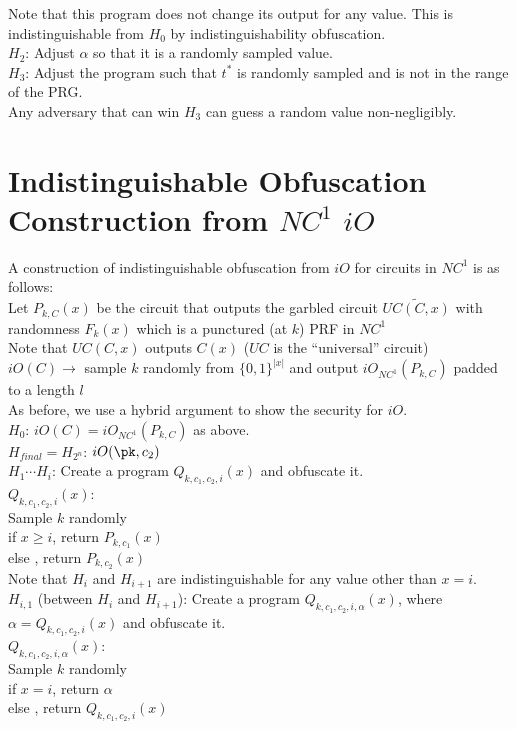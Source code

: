 \noindent Note that this program does not change its output for any value. This is indistinguishable from $H_0$  by indistinguishability obfuscation.\\

\noindent $H_2$: Adjust $\alpha$ so that it is a randomly sampled value.\\
\noindent $H_3$: Adjust the program such that $t^*$ is randomly sampled and is not in the range of the PRG.\\

Any adversary that can win $H_3$ can guess a random value non-negligibly.\\

\section{Indistinguishable Obfuscation Construction from $NC^1$ $iO$}
A construction of indistinguishable obfuscation from $iO$ for circuits in $NC^1$ is as follows:\\
Let $P_{k,C}(x)$ be the circuit that outputs the garbled circuit $\widetilde{UC(C,x)}$ with randomness $F_k(x)$ which is a punctured (at $k$) PRF in $NC^1$\\
\indent Note that $UC(C,x)$ outputs $C(x)$ ($UC$ is the ``universal'' circuit)\\
$iO(C) \rightarrow $ sample $k$ randomly from $\{0,1\}^{|x|}$ and output $iO_{NC^1}(P_{k,C})$ padded to a length $l$\\

As before, we use a hybrid argument to show the security for $iO$.\\
\noindent $H_0$: $iO(C) = iO_{NC^1}(P_{k,C})$ as above.\\
\noindent $H_{final} = H_{2^n}$: $iO(\pk, c_2)$\\
\noindent $H_1 \cdots H_i$: Create a program $Q_{k, c_1, c_2, i}(x)$ and obfuscate it.\\
$Q_{k,c_1,c_2,i}(x)$:\\
\indent Sample $k$ randomly\\
\indent if $x \ge i$, return $P_{k,c_1}(x)$\\
\indent else , return $P_{k,c_2}(x)$\\
\noindent Note that $H_i$ and $H_{i+1}$ are indistinguishable for any value other than $x=i$.\\
\noindent $H_{i,1}$ (between $H_i$ and $H_{i+1}$): Create a program $Q_{k, c_1, c_2, i, \alpha}(x)$, where $\alpha = Q_{k, c_1, c_2, i}(x)$ and obfuscate it.\\
$Q_{k, c_1, c_2, i, \alpha}(x)$:\\
\indent Sample $k$ randomly\\
\indent if $x = i$, return $\alpha$\\
\indent else , return $Q_{k,c_1,c_2, i}(x)$\\

